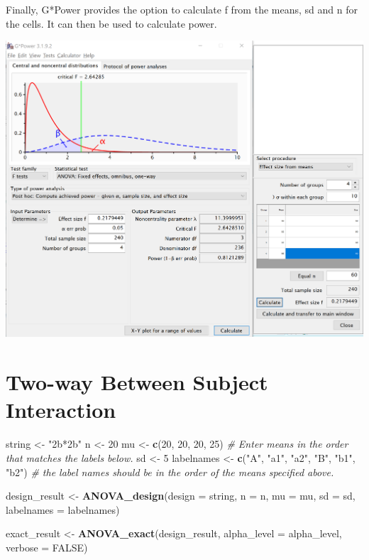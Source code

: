 \documentclass[]{book}
\newenvironment{Shaded}{\begin{snugshade}}{\end{snugshade}}
\newcommand{\CommentTok}[1]{\textcolor[rgb]{0.56,0.35,0.01}{\textit{#1}}}
\newcommand{\DataTypeTok}[1]{\textcolor[rgb]{0.13,0.29,0.53}{#1}}
\newcommand{\DecValTok}[1]{\textcolor[rgb]{0.00,0.00,0.81}{#1}}
\newcommand{\KeywordTok}[1]{\textcolor[rgb]{0.13,0.29,0.53}{\textbf{#1}}}
\newcommand{\NormalTok}[1]{#1}
\newcommand{\OtherTok}[1]{\textcolor[rgb]{0.56,0.35,0.01}{#1}}
\newcommand{\StringTok}[1]{\textcolor[rgb]{0.31,0.60,0.02}{#1}}
\begin{document}
Finally, G*Power provides the option to calculate f from the means, sd and n for the cells. It can then be used to calculate power.

\includegraphics{screenshots/gpower_13.png}

\hypertarget{two-way-between-subject-interaction}{%
\section{Two-way Between Subject Interaction}\label{two-way-between-subject-interaction}}

\begin{Shaded}
\begin{Highlighting}[]
\NormalTok{string <-}\StringTok{ "2b*2b"}
\NormalTok{n <-}\StringTok{ }\DecValTok{20}
\NormalTok{mu <-}\StringTok{ }\KeywordTok{c}\NormalTok{(}\DecValTok{20}\NormalTok{, }\DecValTok{20}\NormalTok{, }\DecValTok{20}\NormalTok{, }\DecValTok{25}\NormalTok{) }
\CommentTok{# Enter means in the order that matches the labels below.}
\NormalTok{sd <-}\StringTok{ }\DecValTok{5}
\NormalTok{labelnames <-}\StringTok{ }\KeywordTok{c}\NormalTok{(}\StringTok{"A"}\NormalTok{, }\StringTok{"a1"}\NormalTok{, }\StringTok{"a2"}\NormalTok{, }\StringTok{"B"}\NormalTok{, }\StringTok{"b1"}\NormalTok{, }\StringTok{"b2"}\NormalTok{) }
\CommentTok{# the label names should be in the order of the means specified above.}

\NormalTok{design_result <-}\StringTok{ }\KeywordTok{ANOVA_design}\NormalTok{(}\DataTypeTok{design =}\NormalTok{ string,}
                   \DataTypeTok{n =}\NormalTok{ n, }
                   \DataTypeTok{mu =}\NormalTok{ mu, }
                   \DataTypeTok{sd =}\NormalTok{ sd, }
                   \DataTypeTok{labelnames =}\NormalTok{ labelnames)}



\NormalTok{exact_result <-}\StringTok{ }\KeywordTok{ANOVA_exact}\NormalTok{(design_result,}
                            \DataTypeTok{alpha_level =}\NormalTok{ alpha_level,}
                            \DataTypeTok{verbose =} \OtherTok{FALSE}\NormalTok{)}
\end{Highlighting}
\end{Shaded}
\end{document}
